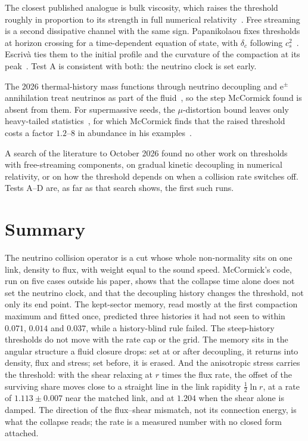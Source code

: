 \documentclass[11pt]{article}
\begin{document}
The closest published analogue is bulk viscosity, which raises the threshold roughly in proportion to its strength in full numerical relativity~\cite{Yuwen}. Free streaming is a second dissipative channel with the same sign. Papanikolaou fixes thresholds at horizon crossing for a time-dependent equation of state, with $\delta_c$ following $c_s^2$~\cite{Pap}. Escriv\`a ties them to the initial profile and the curvature of the compaction at its peak~\cite{Esc}. Test A is consistent with both: the neutrino clock is set early.

The 2026 thermal-history mass functions through neutrino decoupling and e$^\pm$ annihilation treat neutrinos as part of the fluid~\cite{Gonin}, so the step McCormick found is absent from them. For supermassive seeds, the $\mu$-distortion bound leaves only heavy-tailed statistics~\cite{Dave}, for which McCormick finds that the raised threshold costs a factor $1.2$--$8$ in abundance in his examples~\cite{McC}.

A search of the literature to October 2026 found no other work on thresholds with free-streaming components, on gradual kinetic decoupling in numerical relativity, or on how the threshold depends on when a collision rate switches off. Tests A--D are, as far as that search shows, the first such runs.

\section{Summary}

The neutrino collision operator is a cut whose whole non-normality sits on one link, density to flux, with weight equal to the sound speed. McCormick's code, run on five cases outside his paper, shows that the collapse time alone does not set the neutrino clock, and that the decoupling history changes the threshold, not only its end point. The kept-sector memory, read mostly at the first compaction maximum and fitted once, predicted three histories it had not seen to within $0.071$, $0.014$ and $0.037$, while a history-blind rule failed. The steep-history thresholds do not move with the rate cap or the grid. The memory sits in the angular structure a fluid closure drops: set at or after decoupling, it returns into density, flux and stress; set before, it is erased. And the anisotropic stress carries the threshold: with the shear relaxing at $r$ times the flux rate, the offset of the surviving share moves close to a straight line in the link rapidity $\tfrac12\ln r$, at a rate of $1.113\pm0.007$ near the matched link, and at $1.204$ when the shear alone is damped. The direction of the flux--shear mismatch, not its connection energy, is what the collapse reads; the rate is a measured number with no closed form attached.
\end{document}
